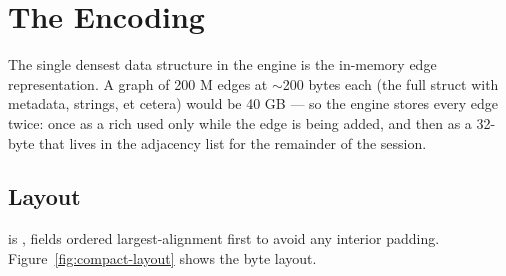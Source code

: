 \chapter{The \Compact{} Encoding}
\label{ch:compact-relation}

The single densest data structure in the engine is the in-memory
edge representation. A graph of 200 M edges at $\sim$200 bytes each
(the full  struct with metadata, strings, et cetera)
would be 40 GB --- so the engine stores every edge twice: once as a
rich  used only while the edge is being added, and
then as a 32-byte \Compact{} that lives in the adjacency list for
the remainder of the session.

\section{Layout}

\Compact{} is \code{\#[repr(C)]}, fields ordered largest-alignment
first to avoid any interior padding. Figure~\ref{fig:compact-layout}
shows the byte layout.

